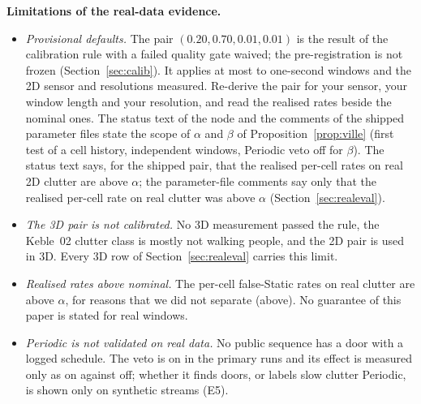 \noindent\textbf{Limitations of the real-data evidence.}
\begin{itemize}
  \item \emph{Provisional defaults.} The pair $(0.20,0.70,0.01,0.01)$ is the result of the calibration rule with a failed quality gate waived; the pre-registration is not frozen (Section~\ref{sec:calib}). It applies at most to one-second windows and the 2D sensor and resolutions measured. Re-derive the pair for your sensor, your window length and your resolution, and read the realised rates beside the nominal ones. The status text of the node and the comments of the shipped parameter files state the scope of $\alpha$ and $\beta$ of Proposition~\ref{prop:ville} (first test of a cell history, independent windows, Periodic veto off for $\beta$). The status text says, for the shipped pair, that the realised per-cell rates on real 2D clutter are above $\alpha$; the parameter-file comments say only that the realised per-cell rate on real clutter was above $\alpha$ (Section~\ref{sec:realeval}).
  \item \emph{The 3D pair is not calibrated.} No 3D measurement passed the rule, the Keble~02 clutter class is mostly not walking people, and the 2D pair is used in 3D. Every 3D row of Section~\ref{sec:realeval} carries this limit.
  \item \emph{Realised rates above nominal.} The per-cell false-Static rates on real clutter are above $\alpha$, for reasons that we did not separate (above). No guarantee of this paper is stated for real windows.
  \item \emph{Periodic is not validated on real data.} No public sequence has a door with a logged schedule. The veto is on in the primary runs and its effect is measured only as on against off; whether it finds doors, or labels slow clutter Periodic, is shown only on synthetic streams (E5).

\end{itemize}
